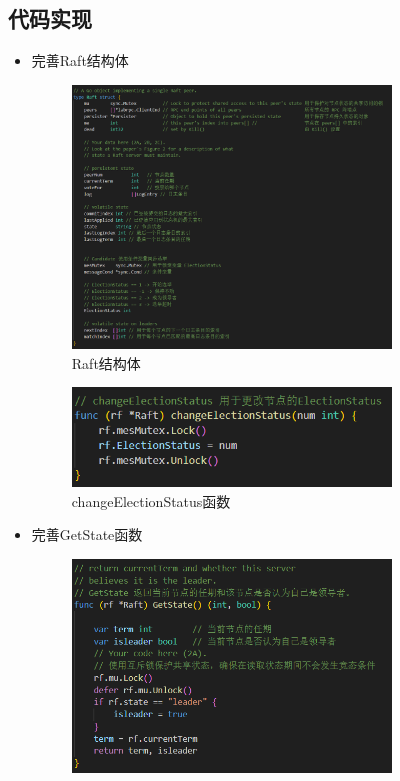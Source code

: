 \documentclass[]{article}
\begin{document}
	\subsection{代码实现}
	\begin{itemize}
		\item 完善Raft结构体
		\begin{figure}[H]
			\centering
			\includegraphics[width=0.8\textwidth]{./2A/Raft.png}
			\caption{Raft结构体}
		\end{figure}
		\begin{figure}[H]
			\centering
			\includegraphics[width=0.8\textwidth]{./2A/changeElectionStatus.png}
			\caption{changeElectionStatus函数}
		\end{figure}
		\item 完善GetState函数
		\begin{figure}[H]
			\centering
			\includegraphics[width=0.8\textwidth]{./2A/GetState.png}

\end{figure}
\end{itemize}
\end{document}
